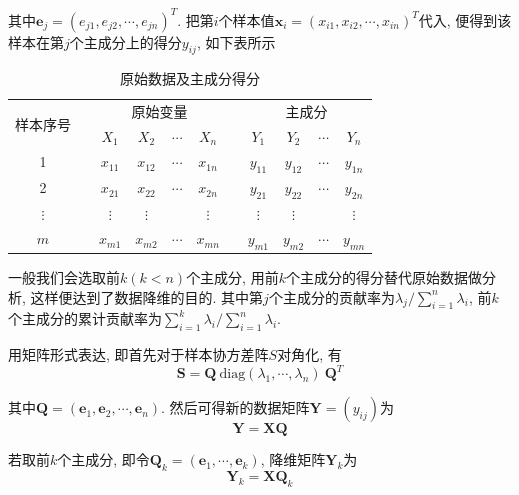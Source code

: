 \documentclass[a4paper,UTF8]{ctexart}
\theoremstyle{plain} \newtheorem{theorem}{定理}[section]
\theoremstyle{plain} \newtheorem{definition}{定义}[section]
\theoremstyle{plain} \newtheorem{lemma}{引理}[section]
\theoremstyle{plain} \newtheorem{proposition}{命题}[section]
\theoremstyle{plain} \newtheorem{example}{例}[section]
\theoremstyle{plain} \newtheorem{remark}{注}[section]
\theoremstyle{plain} \newtheorem{corollary}{推论}[section]
\begin{document}
其中$\bm{e}_{j} = (e_{j1}, e_{j2}, \cdots, e_{jn})^{T}$. 把第$i$个样本值$\bm{x}_i = (x_{i1}, x_{i2}, \cdots, x_{in})^{T}$代入, 便得到该样本在第$j$个主成分上的得分$y_{ij}$, 如下表所示
\begin{table}[!htb]
\centering
\caption{原始数据及主成分得分}
\label{tab:score}
\begin{tabular}{c|ccccc|ccccc}
\hline
\multirow{2}{*}{样本序号} &  & \multicolumn{4}{c}{原始变量}                  &  & \multicolumn{4}{c}{主成分}                   \\ \cline{2-11} 
                      &  & $X_1$    & $X_2$    & $\cdots$ & $X_n$    &  & $Y_1$    & $Y_2$    & $\cdots$ & $Y_n$    \\ \hline
1                     &  & $x_{11}$ & $x_{12}$ & $\cdots$ & $x_{1n}$ &  & $y_{11}$ & $y_{12}$ & $\cdots$ & $y_{1n}$ \\ \hline
2                     &  & $x_{21}$ & $x_{22}$ & $\cdots$ & $x_{2n}$ &  & $y_{21}$ & $y_{22}$ & $\cdots$ & $y_{2n}$ \\ \hline
$\vdots$              &  & $\vdots$ & $\vdots$ &          & $\vdots$ &  & $\vdots$ & $\vdots$ &          & $\vdots$ \\ \hline
$m$                   &  & $x_{m1}$ & $x_{m2}$ & $\cdots$ & $x_{mn}$ &  & $y_{m1}$ & $y_{m2}$ & $\cdots$ & $y_{mn}$ \\ \hline
\end{tabular}
\end{table}

一般我们会选取前$k(k < n)$个主成分, 用前$k$个主成分的得分替代原始数据做分析, 这样便达到了数据降维的目的. 其中第$j$个主成分的贡献率为$\lambda_{j} / \sum\limits_{i=1}^{n} \lambda_i$, 前$k$个主成分的累计贡献率为$\sum\limits_{i=1}^{k} \lambda_i / \sum\limits_{i=1}^{n} \lambda_i$.

用矩阵形式表达, 即首先对于样本协方差阵$S$对角化, 有
\begin{equation*}
\bm{S} = \bm{Q} ~ \mathrm{diag}(\lambda_1, \cdots, \lambda_n) ~ \bm{Q}^{T} 
\end{equation*}

其中$\bm{Q} = (\bm{e}_1, \bm{e}_2, \cdots, \bm{e}_n)$. 然后可得新的数据矩阵$\bm{Y} = (y_{ij})$为
\begin{equation*}
\bm{Y} = \bm{X} \bm{Q}
\end{equation*}

若取前$k$个主成分, 即令$\bm{Q}_k = (\bm{e}_1, \cdots, \bm{e}_k)$, 降维矩阵$\bm{Y}_k$为
\begin{equation*}
\bm{Y}_k = \bm{X} \bm{Q}_k
\end{equation*}
\end{document}
